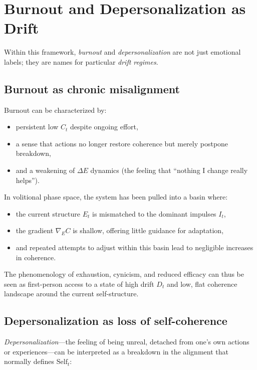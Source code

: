 \documentclass[12pt,a4paper]{report}
\begin{document}
\section{Burnout and Depersonalization as Drift}

Within this framework, \emph{burnout} and \emph{depersonalization} are not just emotional labels; they are names for particular \emph{drift regimes}.

\subsection*{Burnout as chronic misalignment}

Burnout can be characterized by:

\begin{itemize}[leftmargin=2em]
    \item persistent low \(C_t\) despite ongoing effort,
    \item a sense that actions no longer restore coherence but merely postpone breakdown,
    \item and a weakening of $\Delta E$ dynamics (the feeling that ``nothing I change really helps'').
\end{itemize}

In volitional phase space, the system has been pulled into a basin where:

\begin{itemize}[leftmargin=2em]
    \item the current structure \(E_t\) is mismatched to the dominant impulses \(I_t\),
    \item the gradient \(\nabla_E C\) is shallow, offering little guidance for adaptation,
    \item and repeated attempts to adjust within this basin lead to negligible increases in coherence.
\end{itemize}

The phenomenology of exhaustion, cynicism, and reduced efficacy can thus be seen as first-person access to a state of high drift \(D_t\) and low, flat coherence landscape around the current self-structure.

\subsection*{Depersonalization as loss of self-coherence}

\emph{Depersonalization}---the feeling of being unreal, detached from one's own actions or experiences---can be interpreted as a breakdown in the alignment that normally defines \(\text{Self}_t\):
\end{document}
